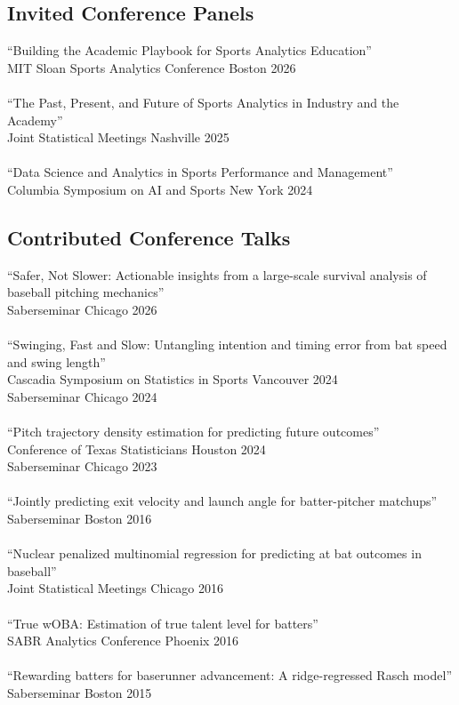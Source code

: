 \documentclass{article}
\begin{document}
\subsection*{\sc Invited Conference Panels}

``Building the Academic Playbook for Sports Analytics Education''\\
MIT Sloan Sports Analytics Conference \hfill Boston 2026\\
~\\
``The Past, Present, and Future of Sports Analytics in Industry and the Academy''\\
Joint Statistical Meetings \hfill Nashville 2025\\
~\\
``Data Science and Analytics in Sports Performance and Management''\\
Columbia Symposium on AI and Sports \hfill New York 2024

\subsection*{\sc Contributed Conference Talks}

``Safer, Not Slower: Actionable insights from a large-scale survival analysis of baseball pitching mechanics''\\
Saberseminar \hfill Chicago 2026\\
~\\
``Swinging, Fast and Slow: Untangling intention and timing error from bat speed and swing length''\\
Cascadia Symposium on Statistics in Sports \hfill Vancouver 2024\\
Saberseminar \hfill Chicago 2024\\
~\\
``Pitch trajectory density estimation for predicting future outcomes''\\
Conference of Texas Statisticians \hfill Houston 2024\\
Saberseminar \hfill Chicago 2023\\
~\\
``Jointly predicting exit velocity and launch angle for batter-pitcher matchups''\\
Saberseminar \hfill Boston 2016\\
~\\
``Nuclear penalized multinomial regression for predicting at bat outcomes in baseball''\\
Joint Statistical Meetings \hfill Chicago 2016\\
~\\
``True wOBA: Estimation of true talent level for batters''\\
SABR Analytics Conference \hfill Phoenix 2016\\
~\\
``Rewarding batters for baserunner advancement: A ridge-regressed Rasch model''\\
Saberseminar \hfill Boston 2015
\end{document}
